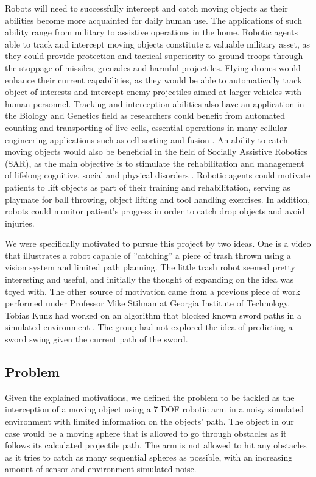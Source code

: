 \documentclass[letterpaper, 10 pt, conference]{ieeeconf}  %
\begin{document}
Robots will need to successfully intercept and catch moving objects as their
abilities become more acquainted for daily human use. The applications of such
ability range from military to assistive operations in the home. Robotic agents
able to track and intercept moving objects constitute a valuable military
asset, as they could provide protection and tactical superiority to ground
troops through the stoppage of missiles, grenades and harmful projectiles.
Flying-drones would enhance their current capabilities, as they would be able
to automatically track object of interests and intercept enemy projectiles
aimed at larger vehicles with human personnel.  Tracking and interception
abilities also have an application in the Biology and Genetics field as
researchers could benefit from automated counting and transporting of live
cells, essential operations in many cellular engineering applications such as
cell sorting and fusion \cite{5985660}. An ability to catch moving objects
would also be beneficial in the field of Socially Assistive Robotics (SAR), as
the main objective is to stimulate the rehabilitation and management of
lifelong cognitive, social and physical disorders \cite{5569021}. Robotic
agents could motivate patients to lift objects as part of their training and
rehabilitation, serving as playmate for ball throwing, object lifting and tool
handling exercises. In addition, robots could monitor patient’s progress in
order to catch drop objects and avoid injuries.

We were specifically motivated to pursue this project by two ideas. One is a
video that illustrates a robot capable of ”catching” a piece of trash thrown
using a vision system and limited path planning. The little trash robot seemed
pretty interesting and useful, and initially the thought of expanding on the
idea was toyed with. The other source of motivation came from a previous piece
of work performed under Professor Mike Stilman at Georgia Institute of
Technology. Tobias Kunz had worked on an algorithm that blocked known sword
paths in a simulated environment \cite{lampariello2011trajectory}. The group
had not explored the idea of predicting a sword swing given the current path of
the sword.

\subsection{Problem}

Given the explained motivations, we defined the problem to be tackled as the
interception of a moving object using a 7 DOF robotic arm in a noisy simulated
environment with limited information on the objects’ path. The object in our
case would be a moving sphere that is allowed to go through obstacles as it
follows its calculated projectile path. The arm is not allowed to hit any
obstacles as it tries to catch as many sequential spheres as possible, with an
increasing amount of sensor and environment simulated noise.
\end{document}
